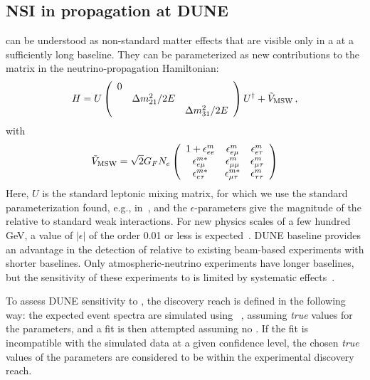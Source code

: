 \subsection{NSI in propagation at DUNE}
  can be understood as non-standard
matter effects that are visible only in a  at a sufficiently long baseline. They can be parameterized as new contributions
to the  matrix in the neutrino-propagation Hamiltonian:
\begin{equation}
  H = U \left( \begin{array}{ccc}
           0 &                    & \\
             & \Delta m_{21}^2/2E & \\
             &                    & \Delta m_{31}^2/2E
         \end{array} \right) U^\dag + \tilde{V}_{\rm MSW} \,,
\end{equation}
with
\begin{equation}
  \tilde{V}_{\rm MSW} = \sqrt{2} G_F N_e
\left(
  \begin{array}{ccc}
    1 + \epsilon^m_{ee}       & \epsilon^m_{e\mu}       & \epsilon^m_{e\tau}  \\
        \epsilon^{m*}_{e\mu}  & \epsilon^m_{\mu\mu}     & \epsilon^m_{\mu\tau} \\
        \epsilon^{m*}_{e\tau} & \epsilon^{m*}_{\mu\tau} & \epsilon^m_{\tau\tau}
  \end{array} 
\right)
\label{eq:epsmatrix}
\end{equation}
Here, $U$ is the standard  leptonic mixing matrix, for which we use the standard parameterization found, e.g., in~\cite{Agashe:2014yua}, 
and the $\epsilon$-parameters give the
magnitude of the  relative to standard weak interactions.  For new physics
scales of a few hundred GeV,  a value of $|\epsilon|$ of the order
0.01 or less is
expected~\cite{Davidson:2003ha,GonzalezGarcia:2007ib,Biggio:2009nt}. DUNE
baseline provides an advantage in the detection of   relative
to existing beam-based experiments with shorter baselines.
Only atmospheric-neutrino experiments have longer baselines, but the sensitivity
of these experiments to   is limited by systematic effects~\cite{Adams:2013qkq}.

To assess DUNE sensitivity to   , the   discovery reach
is defined in the following way: the expected event spectra are
simulated using  ~\cite{Huber:2004ka,Huber:2007ji}, assuming \textit{true} values for the   
parameters, and a fit is then attempted assuming no  . If the fit is
incompatible with the simulated data at a given confidence level,
the chosen \emph{true} values of the   parameters are considered to be within the experimental discovery reach.

